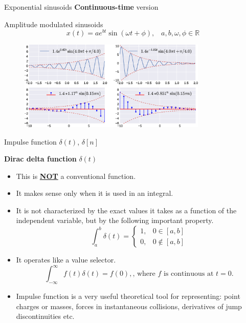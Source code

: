 \documentclass[aspectratio=169]{beamer}
\begin{document}
\begin{frame}{Exponential sinusoids}
\textbf{Continuous-time} version

Amplitude modulated sinusoids
\[ x(t) = a e^{bt} \sin \left(\omega t + \phi \right), \,\,\,\,\, a, b, \omega, \phi \in \mathbb{R}\]

\begin{figure}
\includegraphics[width=0.8\textwidth]{img/exp_sin.eps}
\end{figure}

\end{frame}

\begin{frame}{Impulse function $\delta(t)$, $\delta[n]$}

\textbf{Dirac delta function} $\delta(t)$

\begin{itemize}
\item This is \textbf{\underline{NOT}} a conventional function.
\item It makes sense only when it is used in an integral.
\item It is not characterized by the exact values it takes as a function of the independent variable, but by the following important property.
\[ \int_{a}^{b}\delta (t) = \begin{cases}
1, & 0 \in [a,b] \\
0, & 0 \notin [a, b]
\end{cases} \]
\item It operates like a value selector.
\[ \int_{-\infty}^{\infty}f(t)\delta (t) = f(0), \text{, where $f$ is continuous at } t= 0. \]
\item Impulse function is a very useful theoretical tool for representing: point charges or masses, forces in instantaneous collisions, derivatives of jump discontinuities etc.
\end{itemize}
\end{frame}
\end{document}

